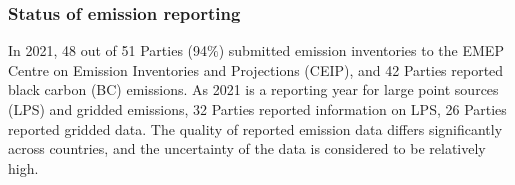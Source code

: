 




\subsubsection*{Status of emission reporting}
In 2021, 48 out of 51 Parties (94$\%$) submitted emission inventories to the EMEP Centre on Emission Inventories and Projections (CEIP), and 42 Parties reported black carbon (BC) emissions. As 2021 is a reporting year for large point sources (LPS) and gridded emissions, 32 Parties reported information on LPS, 26 Parties reported gridded data. The quality of reported emission data differs significantly across countries, and the uncertainty of the data is considered to be relatively high.

